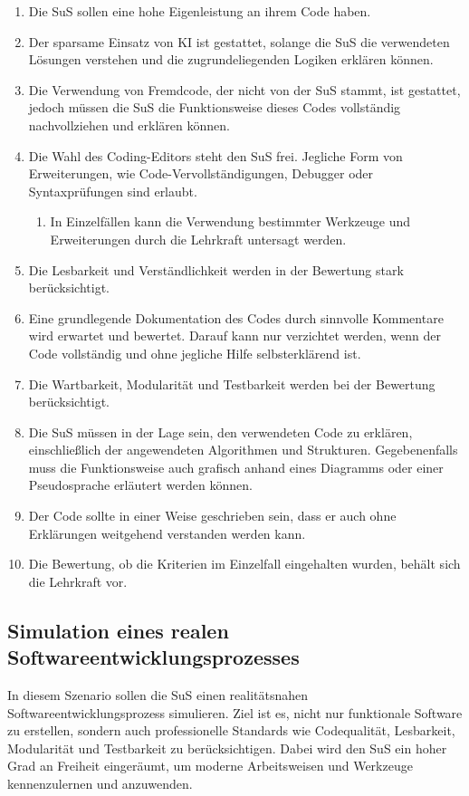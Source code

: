 \documentclass[a4paper,12pt]{article}
\begin{document}
\begin{enumerate}[label=\S\ \arabic*]
    \item Die SuS sollen eine hohe Eigenleistung an ihrem Code haben.
    \item Der sparsame Einsatz von KI ist gestattet, solange die SuS die verwendeten Lösungen verstehen und die zugrundeliegenden Logiken erklären können.
    \item Die Verwendung von Fremdcode, der nicht von der SuS stammt, ist gestattet, jedoch müssen die SuS die Funktionsweise dieses Codes vollständig nachvollziehen und erklären können.
    \item Die Wahl des Coding-Editors steht den SuS frei. Jegliche Form von Erweiterungen, wie Code-Vervollständigungen, Debugger oder Syntaxprüfungen sind erlaubt.
    \begin{enumerate}[label=\S\ \arabic*\alph*]
        \item In Einzelfällen kann die Verwendung bestimmter Werkzeuge und Erweiterungen durch die Lehrkraft untersagt werden.
    \end{enumerate}
    \item Die Lesbarkeit und Verständlichkeit werden in der Bewertung stark berücksichtigt.
    \item Eine grundlegende Dokumentation des Codes durch sinnvolle Kommentare wird erwartet und bewertet. Darauf kann nur verzichtet werden, wenn der Code vollständig und ohne jegliche Hilfe selbsterklärend ist.
    \item Die Wartbarkeit, Modularität und Testbarkeit werden bei der Bewertung berücksichtigt.
    \item Die SuS müssen in der Lage sein, den verwendeten Code zu erklären, einschließlich der angewendeten Algorithmen und Strukturen. Gegebenenfalls muss die Funktionsweise auch grafisch anhand eines Diagramms oder einer Pseudosprache erläutert werden können.
    \item Der Code sollte in einer Weise geschrieben sein, dass er auch ohne Erklärungen weitgehend verstanden werden kann.
    \item Die Bewertung, ob die Kriterien im Einzelfall eingehalten wurden, behält sich die Lehrkraft vor.
\end{enumerate}


\subsection{Simulation eines realen Softwareentwicklungsprozesses}
In diesem Szenario sollen die SuS einen realitätsnahen Softwareentwicklungsprozess simulieren. Ziel ist es, nicht nur funktionale Software zu erstellen, sondern auch professionelle Standards wie Codequalität, Lesbarkeit, Modularität und Testbarkeit zu berücksichtigen. Dabei wird den SuS ein hoher Grad an Freiheit eingeräumt, um moderne Arbeitsweisen und Werkzeuge kennenzulernen und anzuwenden.
\end{document}

